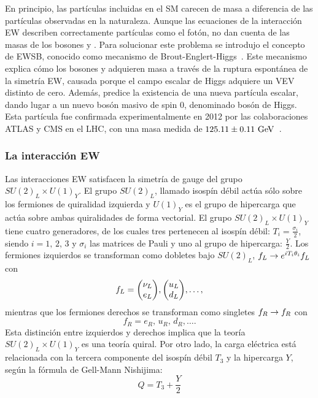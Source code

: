 En principio, las partículas incluidas en el \ac{SM} carecen de masa a diferencia de las partículas observadas en la naturaleza. Aunque las ecuaciones de la interacción \ac{EW} describen correctamente partículas como el fotón, no dan cuenta de las masas de los bosones \Wboson y \Zboson. Para solucionar este problema se introdujo el concepto de \ac{EWSB}, conocido como mecanismo de Brout-Englert-Higgs~\cite{Higgs-1964_1,Higgs-1964_2,Higgs-1966,Englert_Brout-1964}. Este mecanismo explica cómo los bosones \Wboson y \Zboson adquieren masa a través de la ruptura espontánea de la simetría \ac{EW}, causada porque el campo escalar de Higgs adquiere un \ac{VEV} distinto de cero. Además, predice la existencia de una nueva partícula escalar, dando lugar a un nuevo bosón masivo de spin 0, denominado bosón de Higgs. Esta partícula fue confirmada experimentalmente en 2012 por las colaboraciones \ac{ATLAS} y \ac{CMS} en el \ac{LHC}, con una masa medida de \(125.11 \pm 0.11~\text{GeV}\)~\cite{ATLAS-HiggsObservation,CMS-HiggsObservation,ATLAS-Higgs-2024}.








\subsubsection{La interacción \acl{EW}}

Las interacciones \ac{EW} satisfacen la simetría de gauge del grupo \(SU(2)_L \times U(1)_Y\). El grupo \(SU(2)_L\), llamado isospín débil actúa sólo sobre los fermiones de quiralidad izquierda y \(U(1)_Y\) es el grupo de hipercarga que actúa sobre ambas quiralidades de forma vectorial.
El grupo \(SU(2)_L \times U(1)_Y\) tiene cuatro generadores, de los cuales tres pertenecen al isospín débil: \(T_i = \frac{\sigma_i}{2}\), siendo \(i = 1,\, 2,\, 3\) y \(\sigma_i\) las matrices de Pauli y uno al grupo de hipercarga: \(\frac{Y}{2}\). Los fermiones izquierdos se transforman como dobletes bajo \(SU(2)_L\), \(f_L \rightarrow e^{i T_i \theta_i} f_L\) con
\begin{equation}
    f_L = \mqty( \nu_L\\ e_L ), \mqty( u_L\\ d_L ), \dots,
\end{equation}
mientras que los fermiones derechos se transforman como singletes \(f_R \rightarrow f_R\) con
\begin{equation}
    f_R = e_R, \, u_R,\, d_R, \dots.
\end{equation}
Esta distinción entre izquierdos y derechos implica que la teoría \(SU(2)_L \times U(1)_Y\) es una teoría quiral.
Por otro lado, la carga eléctrica está relacionada con la tercera componente del isospín débil \(T_3\) y la hipercarga \(Y\), según la fórmula de Gell-Mann Nishijima:
\begin{equation}
    Q = T_3 + \frac{Y}{2}
\end{equation}

